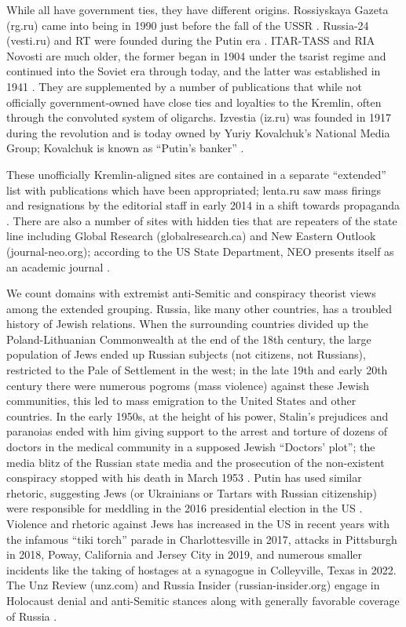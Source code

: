 While all have government ties, they have different origins.
Rossiyskaya Gazeta (rg.ru) came into being in 1990 just before the fall of the USSR \cite{strovsky2021}.
Russia-24 (vesti.ru) and RT were founded during the Putin era \cite[p. 305]{yablokov2015}.
ITAR-TASS and RIA Novosti are much older, the former began in 1904 under the tsarist regime and continued into the Soviet era through today, and the latter was established in 1941 \cite{watanabe2017, simons2016}.
They are supplemented by a number of publications that while not officially government-owned have close ties and loyalties to the Kremlin, often through the convoluted system of oligarchs.
Izvestia (iz.ru) was founded in 1917 during the revolution and is today owned by Yuriy Kovalchuk's National Media Group; Kovalchuk is known as ``Putin's banker'' \cite{voltmer2000}.

These unofficially Kremlin-aligned sites are contained in a separate ``extended'' list with publications which have been appropriated; lenta.ru saw mass firings and resignations by the editorial staff in early 2014 in a shift towards propaganda \cite[p. 45]{lazitski2020}.
There are also a number of sites with hidden ties that are repeaters of the state line including Global Research (globalresearch.ca) and New Eastern Outlook (journal-neo.org); according to the US State Department, NEO presents itself as an academic journal \cite{nyt:globalresearch, statedept}.

We count domains with extremist anti-Semitic and conspiracy theorist views among the extended grouping.
Russia, like many other countries, has a troubled history of Jewish relations. 
When the surrounding countries divided up the Poland-Lithuanian Commonwealth at the end of the 18th century, the large population of Jews ended up Russian subjects (not citizens, not Russians), restricted to the Pale of Settlement in the west; in the late 19th and early 20th century there were numerous pogroms (mass violence) against these Jewish communities, this led to mass emigration to the United States and other countries.
In the early 1950s, at the height of his power, Stalin's prejudices and paranoias ended with him giving support to the arrest and torture of dozens of doctors in the medical community in a supposed Jewish ``Doctors' plot''; the media blitz of the Russian state media and the prosecution of the non-existent conspiracy stopped with his death in March 1953 \cite[ch. 56]{montefiore2007}.
Putin has used similar rhetoric, suggesting Jews (or Ukrainians or Tartars with Russian citizenship) were responsible for meddling in the 2016 presidential election in the US \cite{putin2018}.
Violence and rhetoric against Jews has increased in the US in recent years with the infamous ``tiki torch'' parade in Charlottesville in 2017, attacks in Pittsburgh in 2018, Poway, California and Jersey City in 2019, and numerous smaller incidents like the taking of hostages at a synagogue in Colleyville, Texas in 2022. 
The Unz Review (unz.com) and Russia Insider (russian-insider.org) engage in Holocaust denial and anti-Semitic stances along with generally favorable coverage of Russia \cite{bevensee2018}.

